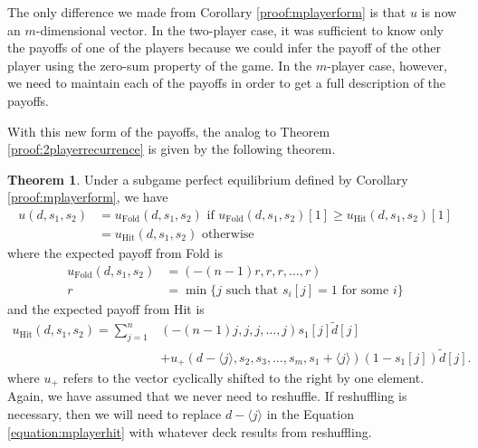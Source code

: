 \documentclass{article}
\theoremstyle{definition}
\newcounter{a}
\newtheorem{theorem}[a]{Theorem}
\begin{document}
The only difference we made from Corollary \ref{proof:mplayerform} is that $u$ is now an $m$-dimensional vector. In the two-player case, it was sufficient to know only the payoffs of one of the players because we could infer the payoff of the other player using the zero-sum property of the game. In the $m$-player case, however, we need to maintain each of the payoffs in order to get a full description of the payoffs.

With this new form of the payoffs, the analog to Theorem \ref{proof:2playerrecurrence} is given by the following theorem.

\begin{theorem}
Under a subgame perfect equilibrium defined by Corollary \ref{proof:mplayerform}, we have
\begin{equation}\begin{split}
u(d,s_1, s_2) &= u_{\text{Fold}} (d,s_1, s_2) \text{ if } u_{\text{Fold}} (d,s_1, s_2) [1] \ge u_{\text{Hit}} (d,s_1, s_2)[1] \\
&= u_{\text{Hit}} (d,s_1, s_2) \text{ otherwise}
\label{equation:mplayerrecurrence}
\end{split}\end{equation}
where the expected payoff from Fold is
\begin{equation}\begin{split}
u_{\text{Fold}} (d,s_1, s_2) &= (-(n-1)r,r,r,\dots,r) \\
r &= \min\{j \text{ such that } s_i [j] = 1 \text{ for some } i\}
\label{equation:mplayerfold}
\end{split}\end{equation}
and the expected payoff from Hit is
\begin{equation}\begin{split}
u_{{\text{Hit}}} (d,s_1, s_2) = \sum_{j=1}^n & (-(n-1)j,j,j,\dots,j) s_1 [j] \tilde{d}[j] \\
& + u_{+}(d - \langle j \rangle, s_2, s_3, \dots, s_m, s_1 + \langle j \rangle) (1 - s_1 [j]) \tilde{d} [j].
\label{equation:mplayerhit}
\end{split}\end{equation}
where $u_{+}$ refers to the vector cyclically shifted to the right by one element. Again, we have assumed that we never need to reshuffle. If reshuffling is necessary, then we will need to replace $d - \langle j \rangle$ in the Equation \ref{equation:mplayerhit} with whatever deck results from reshuffling.
\label{proof:mplayerrecurrence}
\end{theorem}
\end{document}
